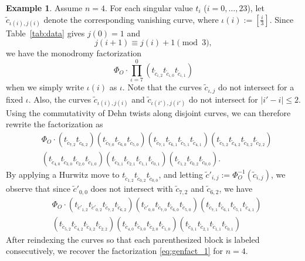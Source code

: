 \documentclass[10pt,a4paper,reqno]{amsart}
\theoremstyle{definition}
\newtheorem{exam}[thm]{Example}
\numberwithin{equation}{section}
\numberwithin{figure}{section}
\begin{document}
\begin{exam}
Assume $n=4$. 
For each singular value $t_i$ ($i=0,\dots, 23$), let $\tilde{c}_{\iota(i), j(i)}$ denote the corresponding vanishing curve,
where $\iota(i):=[\frac{i}{3}]$.
Since Table~\ref{tab:data} gives $j(0)=1$ and
\[j(i+1)\equiv j(i)+1 \pmod 3,\] we have the monodromy factorization
\[\Phi_O \cdot \prod_{\iota=7}^0(t_{\tilde{c}_{\iota,2}}t_{\tilde{c}_{\iota,0}}t_{\tilde{c}_{\iota,1}})\]
when we simply write $\iota(i)$ as $\iota$.
Note that the curves $\tilde{c}_{\iota,j}$ do not intersect for a fixed $\iota$.
Also, the curves $\tilde{c}_{\iota(i),j(i)}$ and $\tilde{c}_{\iota(i'),j(i')}$ do not intersect for $|i'-i|\le 2$.
Using the commutativity of Dehn twists along disjoint curves, 
we can therefore rewrite the factorization as
\begin{align*}
&\Phi_O \cdot (t_{\tilde{c}_{7,2}}t_{\tilde{c}_{6,2}})
(t_{\tilde{c}_{7,0}}t_{\tilde{c}_{6,0}}t_{\tilde{c}_{5,0}})
(t_{\tilde{c}_{7,1}}t_{\tilde{c}_{6,1}}t_{\tilde{c}_{5,1}}t_{\tilde{c}_{4,1}})
(t_{\tilde{c}_{5,2}}t_{\tilde{c}_{4,2}}t_{\tilde{c}_{3,2}}t_{\tilde{c}_{2,2}})\\
&(t_{\tilde{c}_{4,0}}t_{\tilde{c}_{3,0}}t_{\tilde{c}_{2,0}}t_{\tilde{c}_{1,0}})
(t_{\tilde{c}_{3,1}}t_{\tilde{c}_{2,1}}t_{\tilde{c}_{1,1}}t_{\tilde{c}_{0,1}})
(t_{\tilde{c}_{1,2}}t_{\tilde{c}_{0,2}}t_{\tilde{c}_{0,0}}).
\end{align*}
By applying a Hurwitz move to $t_{\tilde{c}_{1,2}}t_{\tilde{c}_{0,2}}t_{\tilde{c}_{0,0}}$, and letting
$\tilde{c}'_{i,j}:=\Phi_O^{-1}(\tilde{c}_{i,j})$,
we observe that since $\tilde{c}'_{0,0}$ does not intersect with $\tilde{c}_{7,2}$ and $\tilde{c}_{6,2}$, we have
\begin{align*}
&\Phi_O \cdot (t_{\tilde{c}'_{1,2}}t_{\tilde{c}'_{0,2}}t_{\tilde{c}_{7,2}}t_{\tilde{c}_{6,2}})
(t_{\tilde{c}'_{0,0}}t_{\tilde{c}_{7,0}}t_{\tilde{c}_{6,0}}t_{\tilde{c}_{5,0}})
(t_{\tilde{c}_{7,1}}t_{\tilde{c}_{6,1}}t_{\tilde{c}_{5,1}}t_{\tilde{c}_{4,1}})\\
&(t_{\tilde{c}_{5,2}}t_{\tilde{c}_{4,2}}t_{\tilde{c}_{3,2}}t_{\tilde{c}_{2,2}})
(t_{\tilde{c}_{4,0}}t_{\tilde{c}_{3,0}}t_{\tilde{c}_{2,0}}t_{\tilde{c}_{1,0}})
(t_{\tilde{c}_{3,1}}t_{\tilde{c}_{2,1}}t_{\tilde{c}_{1,1}}t_{\tilde{c}_{0,1}})
\end{align*}
After reindexing the curves so that each parenthesized block is labeled consecutively,
we recover the factorization \eqref{eq:genfact_1} for $n=4$.
\end{exam}
\end{document}
